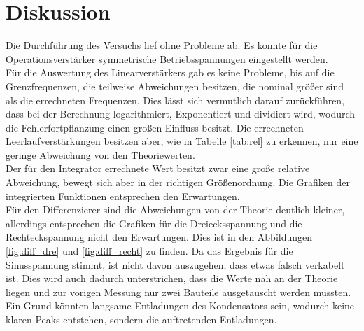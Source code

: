 \newpage
\section{Diskussion}

\noindent
Die Durchführung des Versuchs lief ohne Probleme ab. Es konnte für die Operationsverstärker symmetrische Betriebsspannungen eingestellt werden.\\
Für die Auswertung des Linearverstärkers gab es keine Probleme, bis auf die Grenzfrequenzen, die teilweise Abweichungen besitzen, die nominal größer sind als die errechneten Frequenzen.
Dies lässt sich vermutlich darauf zurückführen, dass bei der Berechnung logarithmiert, Exponentiert und dividiert wird, wodurch die Fehlerfortpflanzung einen großen Einfluss besitzt.
Die errechneten Leerlaufverstärkungen besitzen aber, wie in Tabelle \ref{tab:rel} zu erkennen, nur eine geringe Abweichung von den Theoriewerten.\\
Der für den Integrator errechnete Wert besitzt zwar eine große relative Abweichung, bewegt sich aber in der richtigen Größenordnung. 
Die Grafiken der integrierten Funktionen entsprechen den Erwartungen.\\
Für den Differenzierer sind die Abweichungen von der Theorie deutlich kleiner, allerdings entsprechen die Grafiken für die Dreiecksspannung und die Rechteckspannung nicht den Erwartungen.
Dies ist in den Abbildungen \ref{fig:diff_dre} und \ref{fig:diff_recht} zu finden. 
Da das Ergebnis für die Sinusspannung stimmt, ist nicht davon auszugehen, dass etwas falsch verkabelt ist. 
Dies wird auch dadurch unterstrichen, dass die Werte nah an der Theorie liegen und zur vorigen Messung nur zwei Bauteile ausgetauscht werden mussten.
Ein Grund könnten langsame Entladungen des Kondensators sein, wodurch keine klaren Peaks entstehen, sondern die auftretenden Entladungen. 



